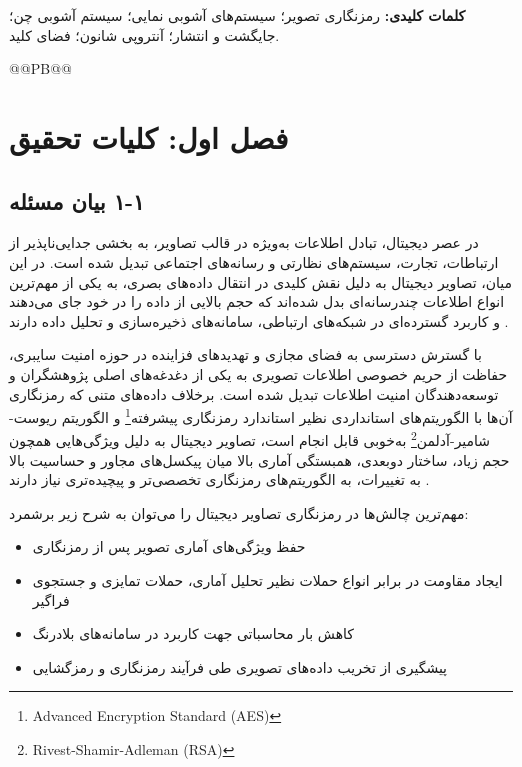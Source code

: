 \textbf{کلمات کلیدی:} رمزنگاری تصویر؛ سیستم‌های آشوبی نمایی؛ سیستم آشوبی چن؛ جایگشت و انتشار؛ آنتروپی شانون؛ فضای کلید.



@@PB@@




\chapter{فصل اول: کلیات تحقیق}
\section{‏۱‏-‏۱‏ بيان مسئله}

در عصر دیجیتال، تبادل اطلاعات به‌ویژه در قالب تصاویر، به بخشی جدایی‌ناپذیر از ارتباطات، تجارت، سیستم‌های نظارتی و رسانه‌های اجتماعی تبدیل شده است. در این میان، تصاویر دیجیتال به دلیل نقش کلیدی در انتقال داده‌های بصری، به یکی از مهم‌ترین انواع اطلاعات چندرسانه‌ای بدل شده‌اند که حجم بالایی از داده را در خود جای می‌دهند و کاربرد گسترده‌ای در شبکه‌های ارتباطی، سامانه‌های ذخیره‌سازی و تحلیل داده دارند \cite{ref1}.

با گسترش دسترسی به فضای مجازی و تهدیدهای فزاینده در حوزه امنیت سایبری، حفاظت از حریم خصوصی اطلاعات تصویری به یکی از دغدغه‌های اصلی پژوهشگران و توسعه‌دهندگان امنیت اطلاعات تبدیل شده است. برخلاف داده‌های متنی که رمزنگاری آن‌ها با الگوریتم‌های استانداردی نظیر استاندارد رمزنگاری پیشرفته\footnote{Advanced Encryption Standard (AES)} و الگوریتم ریوست-شامیر-آدلمن\footnote{Rivest-Shamir-Adleman (RSA)} به‌خوبی قابل انجام است، تصاویر دیجیتال به دلیل ویژگی‌هایی همچون حجم زیاد، ساختار دوبعدی، همبستگی آماری بالا میان پیکسل‌های مجاور و حساسیت بالا به تغییرات، به الگوریتم‌های رمزنگاری تخصصی‌تر و پیچیده‌تری نیاز دارند \cite{ref2, ref3}.

مهم‌ترین چالش‌ها در رمزنگاری تصاویر دیجیتال را می‌توان به شرح زیر برشمرد:

\begin{itemize}
    \item حفظ ویژگی‌های آماری تصویر پس از رمزنگاری
    \item ایجاد مقاومت در برابر انواع حملات نظیر تحلیل آماری، حملات تمایزی و جستجوی فراگیر
    \item کاهش بار محاسباتی جهت کاربرد در سامانه‌های بلادرنگ
    \item پیشگیری از تخریب داده‌های تصویری طی فرآیند رمزنگاری و رمزگشایی
\end{itemize}

